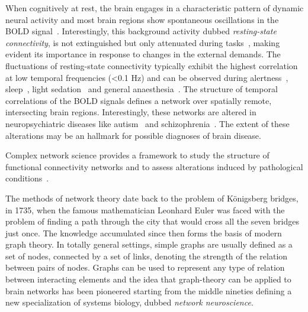 \documentclass[11pt,              a4paper,              twoside,openright,              titlepage,              headinclude,footinclude,                            numbers=noenddot,              cleardoublepage=empty,]{scrreprt}
\begin{document}
When cognitively at rest, the brain engages in a characteristic pattern of dynamic neural activity and most brain regions show spontaneous oscillations in the BOLD signal~\cite{biswal1995,raichle2001,gusnard2001}.
Interestingly, this background activity dubbed \emph{resting-state connectivity}, is not extinguished but only attenuated during tasks~\cite{fransson2006}, making evident its importance in response to changes in the external demands.
The fluctuations of resting-state connectivity typically exhibit the highest correlation at low temporal frequencies (<0.1 Hz) and can be observed during alertness~\cite{fox2006}, sleep~\cite{horovitz2009}, light sedation~\cite{greicius2008} and general anaesthesia~\cite{martuzzi2010}.
The structure of temporal correlations of the BOLD signals defines a network over spatially remote, intersecting brain regions. 
Interestingly, these networks are altered in neuropsychiatric diseases like autism~\cite{rudie2013} and schizophrenia~\cite{vandenheuvel2014}.
The extent of these alterations may be an hallmark for possible diagnoses of brain disease.

Complex network science provides a framework to study the structure of functional connectivity networks and to assess alterations induced by pathological conditions~\cite{bullmore2009,stam2014,crossley2014,fornito2015}.


The methods of network theory date back to the problem of K{\"o}nigsberg bridges, in 1735, when the famous mathematician Leonhard Euler was faced with the problem of finding a path through the city that would cross all the seven bridges just once.
The knowledge accumulated since then forms the basis of modern graph theory.
In totally general settings, simple graphs are usually defined as a set of nodes,  connected by a set of links, denoting the strength of the relation between pairs of nodes.
Graphs can be used to represent any type of relation between interacting elements and the idea that graph-theory can be applied to brain networks has been pioneered starting from the middle nineties defining a new specialization of systems biology, dubbed \emph{network neuroscience}.
\end{document}
